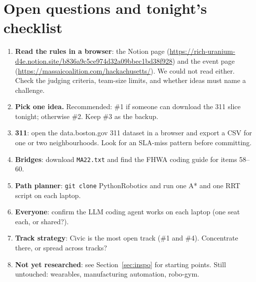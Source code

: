 \documentclass[11pt]{article}
\begin{document}
\section{Open questions and tonight's checklist}\label{sec:questions}
\begin{enumerate}
\item \textbf{Read the rules in a browser}: the Notion page
  (\url{https://rich-uranium-d4e.notion.site/b836a9c5ce974d32a09bbec1bd38f928}) and the event page
  (\url{https://massaicoalition.com/hackachusetts/}). We could not read either. Check the
  judging criteria, team-size limits, and whether ideas must name a challenge.
\item \textbf{Pick one idea.} Recommended: \#1 if someone can download the 311 slice tonight;
  otherwise \#2. Keep \#3 as the backup.
\item \textbf{311}: open the data.boston.gov 311 dataset in a browser and export a CSV for one
  or two neighbourhoods. Look for an SLA-miss pattern before committing.
\item \textbf{Bridges}: download \texttt{MA22.txt} and find the FHWA coding guide for items 58--60.
\item \textbf{Path planner}: \texttt{git clone} PythonRobotics and run one A* and one RRT
  script on each laptop.
\item \textbf{Everyone}: confirm the LLM coding agent works on each laptop (one seat each, or shared?).
\item \textbf{Track strategy}: Civic is the most open track (\#1 and \#4). Concentrate there,
  or spread across tracks?
\item \textbf{Not yet researched}: see Section~\ref{sec:inspo} for starting points. Still untouched: wearables, manufacturing
  automation, robo-gym.
\end{enumerate}
\end{document}
